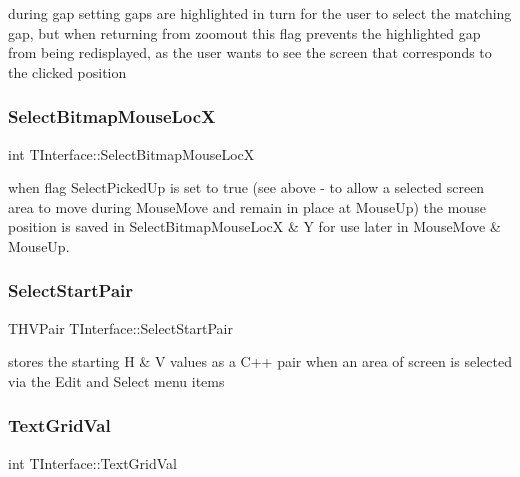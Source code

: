 during gap setting gaps are highlighted in turn for the user to select the matching gap, but when returning from zoomout this flag prevents the highlighted gap from being redisplayed, as the user wants to see the screen that corresponds to the clicked position \mbox{\label{class_t_interface_ae217ab17f77c5f5e6008cdd7d5059e5a}} 
\subsubsection{\texorpdfstring{Select\+Bitmap\+Mouse\+LocX}{SelectBitmapMouseLocX}}
{\footnotesize\ttfamily int T\+Interface\+::\+Select\+Bitmap\+Mouse\+LocX\hspace{0.3cm}{\ttfamily [private]}}

when flag Select\+Picked\+Up is set to true (see above -\/ to allow a selected screen area to move during Mouse\+Move and remain in place at Mouse\+Up) the mouse position is saved in Select\+Bitmap\+Mouse\+LocX \& Y for use later in Mouse\+Move \& Mouse\+Up. \mbox{\label{class_t_interface_a3e24148c477fe9d15568da4ae3f91204}} 
\subsubsection{\texorpdfstring{Select\+Start\+Pair}{SelectStartPair}}
{\footnotesize\ttfamily T\+H\+V\+Pair T\+Interface\+::\+Select\+Start\+Pair\hspace{0.3cm}{\ttfamily [private]}}

stores the starting \textquotesingle{}H\textquotesingle{} \& \textquotesingle{}V\textquotesingle{} values as a C++ pair when an area of screen is selected via the \textquotesingle{}Edit\textquotesingle{} and \textquotesingle{}Select\textquotesingle{} menu items \mbox{\label{class_t_interface_a86dddbbcc24c740334718b1b80082c0d}} 
\subsubsection{\texorpdfstring{Text\+Grid\+Val}{TextGridVal}}
{\footnotesize\ttfamily int T\+Interface\+::\+Text\+Grid\+Val\hspace{0.3cm}{\ttfamily [private]}}


